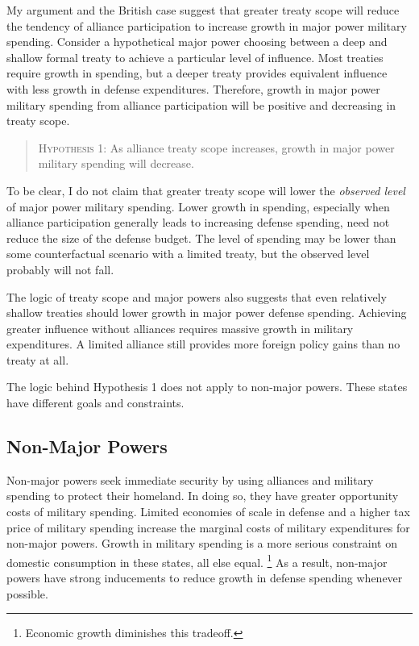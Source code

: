\documentclass[12pt]{article}
\begin{document}
My argument and the British case suggest that greater treaty scope will reduce the tendency of alliance participation to increase growth in major power military spending.
Consider a hypothetical major power choosing between a deep and shallow formal treaty to achieve a particular level of influence.  
Most treaties require growth in spending, but a deeper treaty provides equivalent influence with less growth in defense expenditures. 
Therefore, growth in major power military spending from alliance participation will be positive and decreasing in treaty scope. 


\begin{quote}
\textsc{Hypothesis 1}: As alliance treaty scope increases, growth in major power military spending will decrease. 
\end{quote}


To be clear, I do not claim that greater treaty scope will lower the \textit{observed level} of major power military spending. 
Lower growth in spending, especially when alliance participation generally leads to increasing defense spending, need not reduce the size of the defense budget. 
The level of spending may be lower than some counterfactual scenario with a limited treaty, but the observed level probably will not fall. 


The logic of treaty scope and major powers also suggests that even relatively shallow treaties should lower growth in major power defense spending. 
Achieving greater influence without alliances requires massive growth in military expenditures. 
A limited alliance still provides more foreign policy gains than no treaty at all. 


The logic behind Hypothesis 1 does not apply to non-major powers. 
These states have different goals and constraints. 


\subsection{Non-Major Powers} 


Non-major powers seek immediate security by using alliances and military spending to protect their homeland.  
In doing so, they have greater opportunity costs of military spending. 
Limited economies of scale in defense and a higher tax price of military spending increase the marginal costs of military expenditures for non-major powers. 
Growth in military spending is a more serious constraint on domestic consumption in these states, all else equal.
\footnote{Economic growth diminishes this tradeoff.} 
As a result, non-major powers have strong inducements to reduce growth in defense spending whenever possible.
\end{document}
